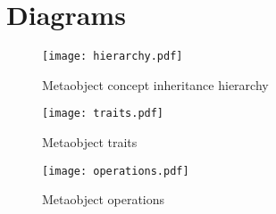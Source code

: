 \section{Diagrams}

\begin{figure}[H]
\centering
\texttt{[image: hierarchy.pdf]}
\caption{Metaobject concept inheritance hierarchy}
\end{figure}

\begin{figure}[H]
\centering
\texttt{[image: traits.pdf]}
\caption{Metaobject traits}
\end{figure}

\begin{figure}[H]
\centering
\texttt{[image: operations.pdf]}
\caption{Metaobject operations}
\end{figure}

